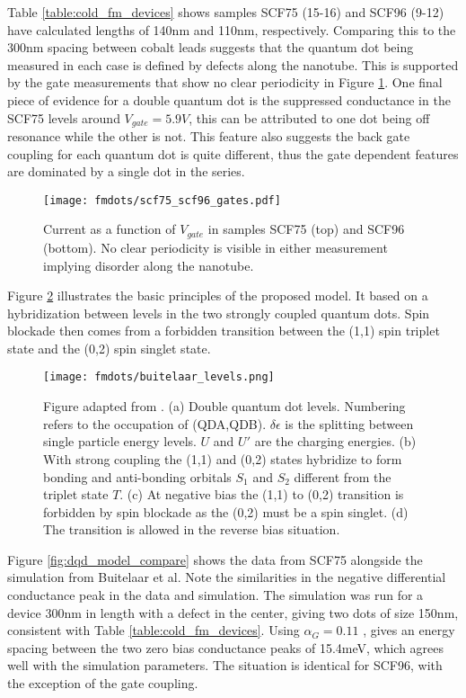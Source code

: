 Table \ref{table:cold_fm_devices} shows samples SCF75 (15-16) and SCF96 (9-12) have calculated lengths of 140nm and 110nm, respectively. Comparing this to the 300nm spacing between cobalt leads suggests that the quantum dot being measured in each case is defined by defects along the nanotube. This is supported by the gate measurements that show no clear periodicity in Figure \ref{fig:scf75_scf96_gates}. One final piece of evidence for a double quantum dot is the suppressed conductance in the SCF75 levels around $V_{gate}=5.9V$, this can be attributed to one dot being off resonance while the other is not. This feature also suggests the back gate coupling for each quantum dot is quite different, thus the gate dependent features are dominated by a single dot in the series.

\begin{figure}
    \centering
    \texttt{[image: fmdots/scf75\_scf96\_gates.pdf]}
    \caption{Current as a function of $V_{gate}$ in samples SCF75 (top) and SCF96 (bottom). No clear periodicity is visible in either measurement implying disorder along the nanotube.}
    \label{fig:scf75_scf96_gates}
\end{figure}

Figure \ref{fig:buitelaar_levels} illustrates the basic principles of the proposed model. It based on a hybridization between levels in the two strongly coupled quantum dots. Spin blockade then comes from a forbidden transition between the (1,1) spin triplet state and the (0,2) spin singlet state.

\begin{figure}
    \centering
    \texttt{[image: fmdots/buitelaar\_levels.png]}
    \caption{Figure adapted from \cite{Buitelaar2008}. (a) Double quantum dot levels. Numbering refers to the occupation of (QDA,QDB). $\delta \epsilon$ is the splitting between single particle energy levels. $U$ and $U'$ are the charging energies. (b) With strong coupling the (1,1) and (0,2) states hybridize to form bonding and anti-bonding orbitals $S_1$ and $S_2$ different from the triplet state $T$. (c) At negative bias the (1,1) to (0,2) transition is forbidden by spin blockade as the (0,2) must be a spin singlet. (d) The transition is allowed in the reverse bias situation.}
    \label{fig:buitelaar_levels}
\end{figure}

Figure \ref{fig:dqd_model_compare} shows the data from SCF75 alongside the simulation from Buitelaar et al. Note the similarities in the negative differential conductance peak in the data and simulation. The simulation was run for a device 300nm in length with a defect in the center, giving two dots of size 150nm, consistent with Table \ref{table:cold_fm_devices}. Using $\alpha_G = 0.11$ , gives an energy spacing between the two zero bias conductance peaks of 15.4meV, which agrees well with the simulation parameters. The situation is identical for SCF96, with the exception of the gate coupling.

